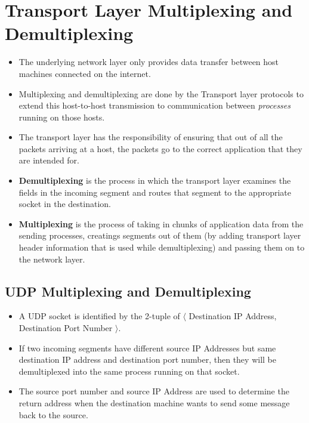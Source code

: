 \documentclass{article}
\theoremstyle{plain}
\theoremstyle{definition}
\begin{document}
\section{Transport Layer Multiplexing and Demultiplexing}
\begin{itemize}
    \item The underlying network layer only provides data transfer between host machines connected on the internet. 
    
    \item Multiplexing and demultiplexing are done by the Transport layer protocols to extend this host-to-host transmission to communication between \textit{processes} running on those hosts. 
    
    \item The transport layer has the responsibility of ensuring that out of all the packets arriving at a host, the packets go to the correct application that they are intended for. 
    
    \item \textbf{Demultiplexing} is the process in which the transport layer examines the fields in the incoming segment and routes that segment to the appropriate socket in the destination.
    
    \item \textbf{Multiplexing} is the process of taking in chunks of application data from the sending processes, creatings segments out of them (by adding transport layer header information that is used while demultiplexing) and passing them on to the network layer. 
\end{itemize}

\subsection{UDP Multiplexing and Demultiplexing}
\begin{itemize}
    \item A UDP socket is identified by the 2-tuple of $\langle$ Destination IP Address, Destination Port Number $\rangle$. 
    
    \item If two incoming segments have different source IP Addresses but same destination IP address and destination port number, then they will be demultiplexed into the same process running on that socket. 
    
    \item The source port number and source IP Address are used to determine the return address when the destination machine wants to send some message back to the source. 
\end{itemize}
\end{document}
